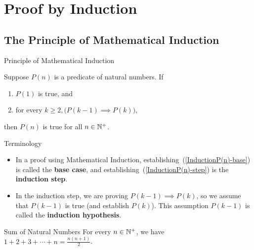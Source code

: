 \documentclass[../MATH-2000-Notes.tex]{subfiles}
\begin{document}
\chapter{Proof by Induction}
\section{The Principle of Mathematical Induction}
\begin{Axiom}
    {Principle of Mathematical Induction}
    \label{InductionP(n)}

    Suppose $P(n)$ is a predicate of natural numbers. If
    \begin{enumerate}
        \renewcommand{\theenumi}{\roman{enumi}}
        \renewcommand{\labelenumi}{\rm(\theenumi)}
        \item \label{InductionP(n)-base} $P(1)$ is true,
              and
        \item \label{InductionP(n)-step}
              for every $ k \ge 2, \bigl( P(k-1) \implies P(k) \bigr)$,
    \end{enumerate}
    then $P(n)$ is true for all $n \in \mathbb{N}^+$.
\end{Axiom}
\begin{Definition}
    {Terminology}~\\
    \begin{itemize}
        \item In a proof using Mathematical Induction, establishing~(\ref{InductionP(n)-base}) is called the \textbf{base case}, and establishing~(\ref{InductionP(n)-step}) is the \textbf{induction step}.
        \item In the induction step, we are proving $P(k-1) \implies P(k)$, so we assume that $P(k-1)$ is true (and establish $P(k)$). This assumption $P(k-1)$ is called the \textbf{induction hypothesis}.
    \end{itemize}
\end{Definition}
\begin{Proposition}
    {Sum of Natural Numbers}
    \label{1+...+n}
    For every $n \in \mathbb{N}^+$, we have
    \ $\displaystyle 1 + 2 + 3 + \cdots + n = \frac{n(n+1)}{2} $.
\end{Proposition}
\end{document}
